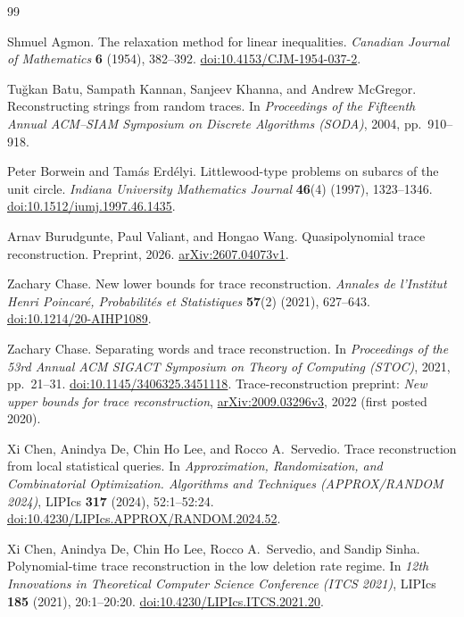 \begin{thebibliography}{99}

Shmuel Agmon.
The relaxation method for linear inequalities.
\emph{Canadian Journal of Mathematics} \textbf{6} (1954), 382--392.
\href{https://doi.org/10.4153/CJM-1954-037-2}{doi:10.4153/CJM-1954-037-2}.

Tu\u{g}kan Batu, Sampath Kannan, Sanjeev Khanna, and Andrew McGregor.
Reconstructing strings from random traces.
In \emph{Proceedings of the Fifteenth Annual ACM--SIAM Symposium on
Discrete Algorithms (SODA)}, 2004, pp.~910--918.

Peter Borwein and Tam\'as Erd\'elyi.
Littlewood-type problems on subarcs of the unit circle.
\emph{Indiana University Mathematics Journal} \textbf{46}(4) (1997),
1323--1346.
\href{https://doi.org/10.1512/iumj.1997.46.1435}{doi:10.1512/iumj.1997.46.1435}.

Arnav Burudgunte, Paul Valiant, and Hongao Wang.
Quasipolynomial trace reconstruction.
Preprint, 2026.
\href{https://arxiv.org/abs/2607.04073v1}{arXiv:2607.04073v1}.

Zachary Chase.
New lower bounds for trace reconstruction.
\emph{Annales de l'Institut Henri Poincar\'e, Probabilit\'es et Statistiques}
\textbf{57}(2) (2021), 627--643.
\href{https://doi.org/10.1214/20-AIHP1089}{doi:10.1214/20-AIHP1089}.

Zachary Chase.
Separating words and trace reconstruction.
In \emph{Proceedings of the 53rd Annual ACM SIGACT Symposium on Theory
of Computing (STOC)}, 2021, pp.~21--31.
\href{https://doi.org/10.1145/3406325.3451118}{doi:10.1145/3406325.3451118}.
Trace-reconstruction preprint: \emph{New upper bounds for trace
reconstruction},
\href{https://arxiv.org/abs/2009.03296v3}{arXiv:2009.03296v3},
2022 (first posted 2020).

Xi Chen, Anindya De, Chin Ho Lee, and Rocco A.~Servedio.
Trace reconstruction from local statistical queries.
In \emph{Approximation, Randomization, and Combinatorial Optimization.
Algorithms and Techniques (APPROX/RANDOM 2024)},
LIPIcs \textbf{317} (2024), 52:1--52:24.
\href{https://doi.org/10.4230/LIPIcs.APPROX/RANDOM.2024.52}{doi:10.4230/LIPIcs.APPROX/RANDOM.2024.52}.

Xi Chen, Anindya De, Chin Ho Lee, Rocco A.~Servedio, and Sandip Sinha.
Polynomial-time trace reconstruction in the low deletion rate regime.
In \emph{12th Innovations in Theoretical Computer Science Conference
(ITCS 2021)}, LIPIcs \textbf{185} (2021), 20:1--20:20.
\href{https://doi.org/10.4230/LIPIcs.ITCS.2021.20}{doi:10.4230/LIPIcs.ITCS.2021.20}.


\end{thebibliography}
